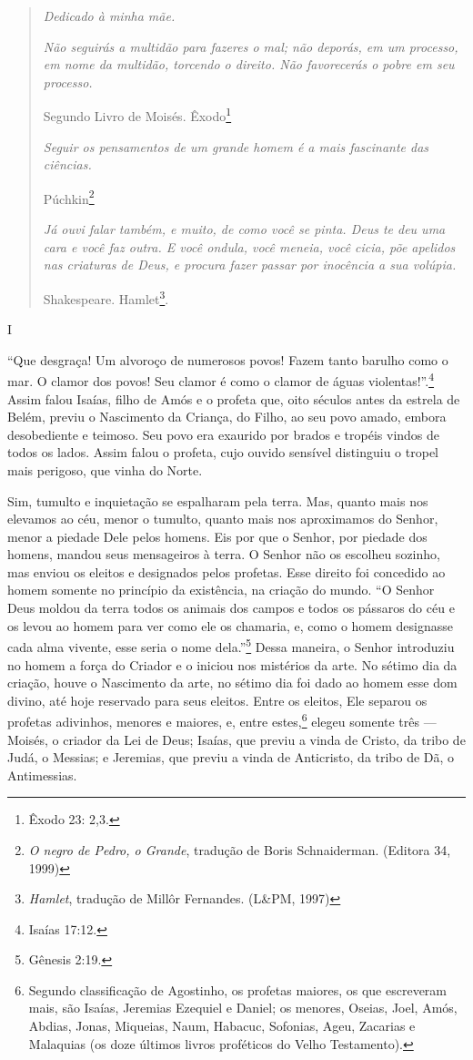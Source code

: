 \begin{quote}
\emph{Dedicado à minha mãe.}

\emph{Não seguirás a multidão para fazeres o mal; não deporás, em um
processo, em nome da multidão, torcendo o direito. Não favorecerás o
pobre em seu processo.}

Segundo Livro de Moisés. Êxodo\footnote{Êxodo 23: 2,3.}

\emph{Seguir os pensamentos de um grande homem é a mais fascinante das
ciências.}

Púchkin\footnote{\emph{O negro de Pedro, o Grande}, tradução de Boris
  Schnaiderman. (Editora 34, 1999)}

\emph{Já ouvi falar também, e muito, de como você se pinta. Deus te deu
uma cara e você faz outra. E você ondula, você meneia, você cicia, põe
apelidos nas criaturas de Deus, e procura fazer passar por inocência a
sua volúpia.}

Shakespeare. Hamlet\footnote{\emph{Hamlet}, tradução de Millôr
  Fernandes. (L\&PM, 1997)}.
\end{quote}

I

``Que desgraça! Um alvoroço de numerosos povos! Fazem tanto barulho como
o mar. O clamor dos povos! Seu clamor é como o clamor de águas
violentas!''.\footnote{Isaías 17:12.} Assim falou Isaías, filho de Amós
e o profeta que, oito séculos antes da estrela de Belém, previu o
Nascimento da Criança, do Filho, ao seu povo amado, embora desobediente
e teimoso. Seu povo era exaurido por brados e tropéis vindos de todos os
lados. Assim falou o profeta, cujo ouvido sensível distinguiu o tropel
mais perigoso, que vinha do Norte.

Sim, tumulto e inquietação se espalharam pela terra. Mas, quanto mais
nos elevamos ao céu, menor o tumulto, quanto mais nos aproximamos do
Senhor, menor a piedade Dele pelos homens. Eis por que o Senhor, por
piedade dos homens, mandou seus mensageiros à terra. O Senhor não os
escolheu sozinho, mas enviou os eleitos e designados pelos profetas.
Esse direito foi concedido ao homem somente no princípio da existência,
na criação do mundo. ``O Senhor Deus moldou da terra todos os animais
dos campos e todos os pássaros do céu e os levou ao homem para ver como
ele os chamaria, e, como o homem designasse cada alma vivente, esse
seria o nome dela.''\footnote{Gênesis 2:19.} Dessa maneira, o Senhor
introduziu no homem a força do Criador e o iniciou nos mistérios da
arte. No sétimo dia da criação, houve o Nascimento da arte, no sétimo
dia foi dado ao homem esse dom divino, até hoje reservado para seus
eleitos. Entre os eleitos, Ele separou os profetas adivinhos, menores e
maiores, e, entre estes,\footnote{Segundo classificação de Agostinho, os
  profetas maiores, os que escreveram mais, são Isaías, Jeremias
  Ezequiel e Daniel; os menores, Oseias, Joel, Amós, Abdias, Jonas,
  Miqueias, Naum, Habacuc, Sofonias, Ageu, Zacarias e Malaquias (os doze
  últimos livros proféticos do Velho Testamento).} elegeu somente três
--- Moisés, o criador da Lei de Deus; Isaías, que previu a vinda de
Cristo, da tribo de Judá, o Messias; e Jeremias, que previu a vinda de
Anticristo, da tribo de Dã, o Antimessias.

